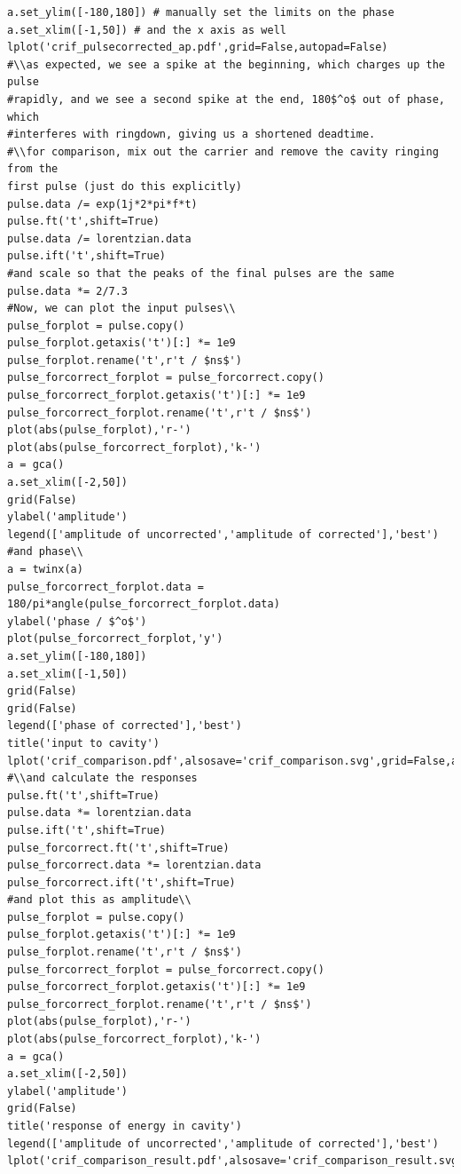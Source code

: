 \begin{lstlisting}
a.set_ylim([-180,180]) # manually set the limits on the phase
a.set_xlim([-1,50]) # and the x axis as well
lplot('crif_pulsecorrected_ap.pdf',grid=False,autopad=False)
#\\as expected, we see a spike at the beginning, which charges up the pulse
#rapidly, and we see a second spike at the end, 180$^o$ out of phase, which
#interferes with ringdown, giving us a shortened deadtime.
#\\for comparison, mix out the carrier and remove the cavity ringing from the
first pulse (just do this explicitly)
pulse.data /= exp(1j*2*pi*f*t)
pulse.ft('t',shift=True)
pulse.data /= lorentzian.data
pulse.ift('t',shift=True)
#and scale so that the peaks of the final pulses are the same
pulse.data *= 2/7.3
#Now, we can plot the input pulses\\
pulse_forplot = pulse.copy()
pulse_forplot.getaxis('t')[:] *= 1e9
pulse_forplot.rename('t',r't / $ns$')
pulse_forcorrect_forplot = pulse_forcorrect.copy()
pulse_forcorrect_forplot.getaxis('t')[:] *= 1e9
pulse_forcorrect_forplot.rename('t',r't / $ns$')
plot(abs(pulse_forplot),'r-')
plot(abs(pulse_forcorrect_forplot),'k-')
a = gca()
a.set_xlim([-2,50])
grid(False)
ylabel('amplitude')
legend(['amplitude of uncorrected','amplitude of corrected'],'best')
#and phase\\
a = twinx(a)
pulse_forcorrect_forplot.data = 180/pi*angle(pulse_forcorrect_forplot.data)
ylabel('phase / $^o$')
plot(pulse_forcorrect_forplot,'y')
a.set_ylim([-180,180])
a.set_xlim([-1,50])
grid(False)
grid(False)
legend(['phase of corrected'],'best')
title('input to cavity')
lplot('crif_comparison.pdf',alsosave='crif_comparison.svg',grid=False,autopad=False)
#\\and calculate the responses
pulse.ft('t',shift=True)
pulse.data *= lorentzian.data
pulse.ift('t',shift=True)
pulse_forcorrect.ft('t',shift=True)
pulse_forcorrect.data *= lorentzian.data
pulse_forcorrect.ift('t',shift=True)
#and plot this as amplitude\\
pulse_forplot = pulse.copy()
pulse_forplot.getaxis('t')[:] *= 1e9
pulse_forplot.rename('t',r't / $ns$')
pulse_forcorrect_forplot = pulse_forcorrect.copy()
pulse_forcorrect_forplot.getaxis('t')[:] *= 1e9
pulse_forcorrect_forplot.rename('t',r't / $ns$')
plot(abs(pulse_forplot),'r-')
plot(abs(pulse_forcorrect_forplot),'k-')
a = gca()
a.set_xlim([-2,50])
ylabel('amplitude')
grid(False)
title('response of energy in cavity')
legend(['amplitude of uncorrected','amplitude of corrected'],'best')
lplot('crif_comparison_result.pdf',alsosave='crif_comparison_result.svg',grid=False)
\end{lstlisting}
